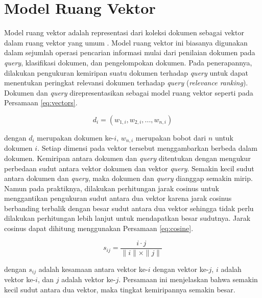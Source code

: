 \section{Model Ruang Vektor}
\label{sec:vsm}
Model ruang vektor adalah representasi dari koleksi dokumen sebagai vektor dalam ruang vektor yang umum \cite{schutze2008introduction}. Model ruang vektor ini biasanya digunakan dalam sejumlah operasi pencarian informasi mulai dari penilaian dokumen pada \textit{query}, klasifikasi dokumen, dan pengelompokan dokumen. Pada penerapannya, dilakukan pengukuran kemiripan suatu dokumen terhadap \textit{query} untuk dapat menentukan peringkat relevansi dokumen terhadap \textit{query} (\textit{relevance ranking}). Dokumen dan \textit{query} direpresentasikan sebagai model ruang vektor seperti pada Persamaan \ref{eq:vectors}.

\begin{equation}
\label{eq:vectors}
	d_i = (w_{1,i}, w_{2,i}, ..., w_{n,i})
\end{equation}

dengan $d_i$ merupakan dokumen ke-$i$, $w_{n,i}$ merupakan bobot dari \term $n$ untuk dokumen $i$. Setiap dimensi pada vektor tersebut menggambarkan \term berbeda dalam dokumen. Kemiripan antara dokumen dan \textit{query} ditentukan dengan mengukur perbedaan sudut antara vektor dokumen dan vektor \textit{query}. Semakin kecil sudut antara dokumen dan \textit{query}, maka dokumen dan \textit{query} dianggap semakin mirip. Namun pada praktiknya, dilakukan perhitungan jarak cosinus untuk menggantikan pengukuran sudut antara dua vektor karena jarak cosinus berbanding terbalik dengan besar sudut antara dua vektor sehingga tidak perlu dilakukan perhitungan lebih lanjut untuk mendapatkan besar sudutnya. Jarak cosinus dapat dihitung menggunakan Persamaan \ref{eq:cosine}.

\begin{equation}
\label{eq:cosine}
s_{ij}=\frac{i\cdot j}{\parallel i \parallel \times \parallel j \parallel}
\end{equation}

dengan $s_{ij}$ adalah kesamaan antara vektor ke-$i$ dengan vektor ke-$j$, $i$ adalah vektor ke-$i$, dan $j$ adalah vektor ke-$j$. Persamaan ini menjelaskan bahwa semakin kecil sudut antara dua vektor, maka tingkat kemiripannya semakin besar.  

